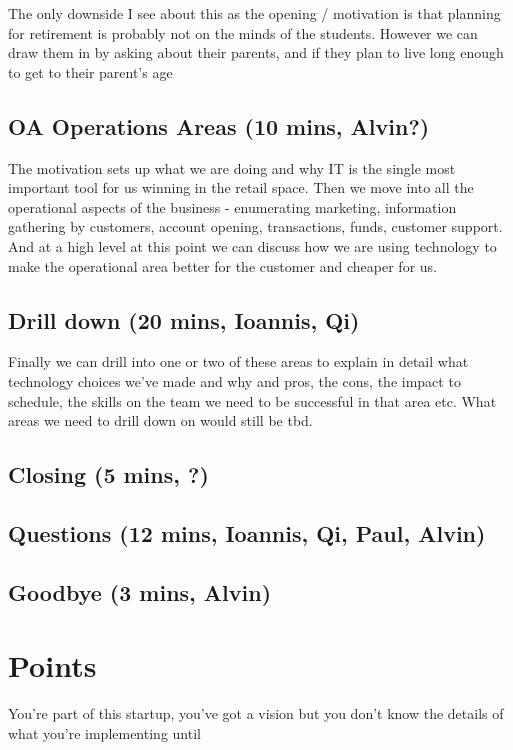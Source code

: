 \documentclass{article}
\begin{document}
The only downside I see about this as the opening / motivation is that planning for retirement is probably not on the minds of the students.  However we can draw them in by asking about their parents, and if they plan to live long enough to get to their parent's age

\subsection{OA Operations Areas (10 mins, Alvin?)}
The motivation sets up what we are doing and why IT is the single most important tool for us winning in the retail space.  Then we move into all the operational aspects of the business - enumerating marketing, information gathering by customers, account opening, transactions, funds, customer support.  And at a high level at this point we can discuss how we are using technology to make the operational area better for the customer and cheaper for us.

\subsection{Drill down (20 mins, Ioannis, Qi)}
Finally we can drill into one or two of these areas to explain in detail what technology choices we've made and why and pros, the cons, the impact to schedule, the skills on the team we need to be successful in that area etc.  What areas we need to drill down on would still be tbd.

\subsection{Closing (5 mins, ?)}

\subsection{Questions (12 mins, Ioannis, Qi, Paul, Alvin)}

\subsection{Goodbye (3 mins, Alvin)}



\section{Points}


You're part of this startup, you've got a vision but you don't know the details of what you're implementing until 
\end{document}
